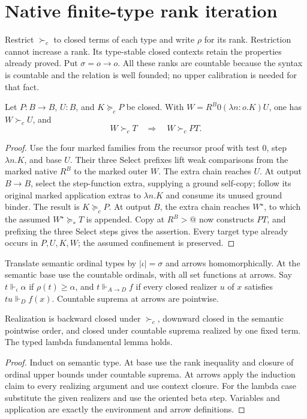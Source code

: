 \documentclass[11pt,a4paper]{article}
\newcommand{\rk}{\rho}
\begin{document}
\section{Native finite-type rank iteration}\label{sec:lower}
Restrict $\succ_c$ to closed terms of each type and write $\rk$ for its rank.
Restriction cannot increase a rank.  Its type-stable closed contexts retain
the properties already proved.  Put $\sigma=o\to o$.
All these ranks are countable because the syntax is countable and the
relation is well founded; no upper calibration is needed for that fact.

\begin{lemma}\label{lem:carrier}
Let $P:B\to B$, $U:B$, and $K\succeq_cP$ be closed.  With
$W=R^B0(\lambda n:o.K)U$, one has $W\succ_cU$, and
\[
 W\succ_cT\quad\Longrightarrow\quad W\succ_cPT.
\]
\end{lemma}
\begin{proof}
Use the four marked families from the recursor proof with test $0$, step
$\lambda n.K$, and base $U$.  Their three Select prefixes lift weak
comparisons from the marked native $R^B$ to the marked outer $W$.
The extra chain reaches $U$.  At output $B\to B$, select the step-function
extra, supplying a ground self-copy; follow its original marked application
extras to $\lambda n.K$ and consume its unused ground binder.  The result is
$K\succeq_cP$.  At output $B$, the extra chain reaches $W^\star$, to which
the assumed $W^\star\succeq_*T$ is appended.  Copy at $R^B>@$ now constructs
$PT$, and prefixing the three Select steps gives the assertion.  Every target
type already occurs in $P,U,K,W$; the assumed confinement is preserved.
\end{proof}

Translate semantic ordinal types by $|\iota|=\sigma$ and arrows
homomorphically.  At the semantic base use the countable ordinals, with all
set functions at arrows.  Say $t\Vdash_{\iota}\alpha$ if $\rk(t)\ge\alpha$,
and $t\Vdash_{A\to D}f$ if every closed realizer $u$ of $x$ satisfies
$tu\Vdash_D f(x)$.  Countable suprema at arrows are pointwise.

\begin{lemma}\label{lem:realclosure}
Realization is backward closed under $\succ_c$, downward closed in the
semantic pointwise order, and closed under countable suprema realized by
one fixed term.  The typed lambda fundamental lemma holds.
\end{lemma}
\begin{proof}
Induct on semantic type.  At base use the rank inequality and closure of
ordinal upper bounds under countable suprema.  At arrows apply the induction
claim to every realizing argument and use context closure.  For the lambda
case substitute the given realizers and use the oriented beta step.  Variables
and application are exactly the environment and arrow definitions.
\end{proof}
\end{document}
